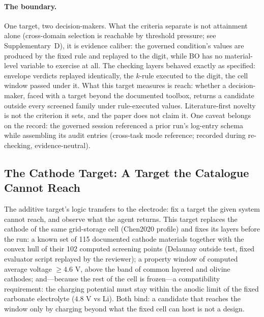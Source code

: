 \paragraph{The boundary.} One target, two decision-makers. What the
criteria separate is not attainment alone (cross-domain selection is
reachable by threshold pressure; see Supplementary~D), it is evidence
caliber: the governed condition's values are produced by the
fixed rule and replayed to the digit, while BO has no material-level variable to
exercise at all. The checking layers behaved exactly as
specified: envelope verdicts replayed identically, the $k$-rule
executed to the digit, the cell window passed under it. What this
target measures is reach: whether a decision-maker, faced with a target
beyond the documented toolbox, returns a candidate outside every screened
family under rule-executed values. Literature-first novelty is not the
criterion it sets, and the paper does not claim it. One caveat belongs on the record: the governed session
referenced a prior run's log-entry schema while assembling its audit
entries (cross-task mode reference; recorded during re-checking,
evidence-neutral).

\subsection{The Cathode Target: A Target the Catalogue Cannot Reach}
\label{sec:t9}

The additive target's logic transfers to the electrode: fix a target the given
system cannot reach, and observe what the agent returns. This target replaces
the cathode of the same grid-storage cell (Chen2020 profile) and fixes its layers
before the run: a known set of 115 documented cathode materials together with the
convex hull of their 102 computed screening points (Delaunay outside test, fixed
evaluator script replayed by the reviewer); a property window of computed
average voltage $\geq 4.6$ V, above the band of common layered and olivine
cathodes; and---because the rest of the cell is frozen---a compatibility
requirement: the charging potential must stay within the anodic limit of the fixed
carbonate electrolyte ($4.8$ V vs Li). Both bind: a candidate that reaches the
window only by charging beyond what the fixed cell can host is not a design.

